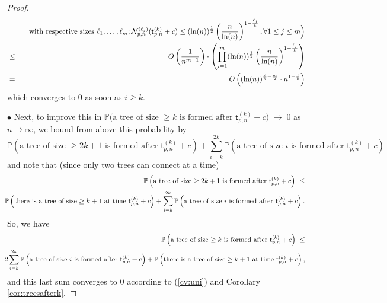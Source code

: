 \documentclass[a4, 11pt]{article}
\numberwithin{equation}{section}
\theoremstyle{plain}
\theoremstyle{definition}
\theoremstyle{remark}
\begin{document}
\begin{proof}
\begin{eqnarray*}
&& \Big. \hspace{0.2cm}\text{ with respective sizes }\ell_1,\ldots,\ell_m;  \mathcal N_{p,n}^{(\ell_j)}(\mathsf t^{(k)}_{p,n} +c) \leq (\ln(n))^{\frac{1}{2}}\left(\frac{n}{\ln(n)}\right)^{1-\frac{\ell_j}{k}}, \forall 1\leq j \leq m\Big) \\
&\leq& O\left(\frac{1}{n^{m-1}} \right) \cdot \left(\prod_{j=1}^m  (\ln(n))^{\frac{1}{2}}\left(\frac{n}{\ln(n)}\right)^{1-\frac{\ell_j}{k}} \right) \\
&=& O \left((\ln(n))^{\frac{i}{k}-\frac{m}{2}} \cdot n^{1-\frac{i}{k}} \right) 
\end{eqnarray*}
which converges to 0 as soon as $i\geq k$.


$\bullet$ Next, to improve this in
$
\mathbb P \big(\text{a tree of size $\geq k$ is formed after }\mathsf t^{(k)}_{p,n} +c \big)  \; {\rightarrow} \; 0
$ as $n \rightarrow \infty$,
we bound from above this probability by
$$
 \mathbb P\left(\text{a tree of size $\geq 2k+1$ is formed after }\mathsf t^{(k)}_{p,n} +c \right)+\sum_{i=k}^{2k}\mathbb P\left(\text{a tree of size $i$ is formed after }\mathsf t^{(k)}_{p,n} +c \right)
$$
and note that (since only two trees can connect at a time)
\begin{eqnarray*}
&&  \hspace{1cm}  \mathbb P\left(\text{a tree of size $\geq 2k+1$ is formed after }\mathsf t^{(k)}_{p,n} +c \right) ~\leq \\ 
&& \hspace{-0.5cm} \mathbb P\left(\text{there is a tree of size}\geq k+1 \text{  at time } \mathsf t^{(k)}_{p,n} +c \right)
+ \sum_{i=k}^{2k} \mathbb P\left(\text{a tree of size $i$ is formed after }\mathsf t^{(k)}_{p,n} +c \right).
\end{eqnarray*}
So, we have
\begin{eqnarray*}
&&  \hspace{1cm} \mathbb P \left(\text{a tree of size $\geq k$ is formed after }\mathsf t^{(k)}_{p,n} +c \right) ~\leq \\ 
&& \hspace{-0.5cm} 2\sum_{i=k}^{2k} \mathbb P \left(\text{a tree of size $i$ is formed after } \mathsf t^{(k)}_{p,n} +c \right) + \mathbb P\left(\text{there is a tree of size}\geq k+1 \text{  at time } \mathsf t^{(k)}_{p,n} +c \right),
\end{eqnarray*}
and this last sum converges to 0 according to (\ref{cv:uni}) and Corollary \ref{cor:treesafterk}.
\end{proof}
\end{document}
